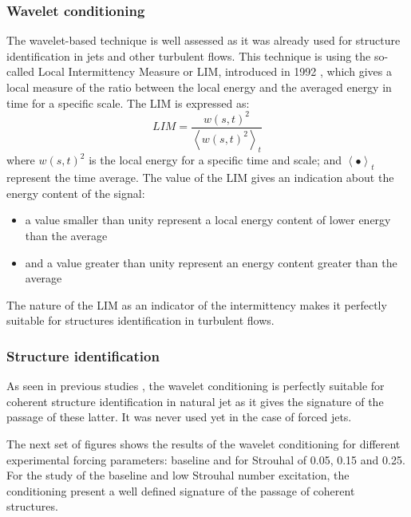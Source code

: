 \documentclass[english]{aiaa-tc}
\begin{document}
\subsubsection{Wavelet conditioning}
The wavelet-based technique is well assessed as it was already used for structure identification in jets and other turbulent flows. This technique is using the so-called Local Intermittency Measure or LIM, introduced in 1992\cite{Farge1992} , which gives a local measure of the ratio between the local energy and the averaged energy in time for a specific scale. The LIM is expressed as:
\begin{equation}
\label{eqn:LIM}
LIM = \frac{w(s, t)^{2}}{\left<w(s, t)^{2}\right>_{t}}
\end{equation}
where $w(s, t)^{2}$ is the local energy for a specific time and scale; and $\left< \bullet \right>_{t}$ represent the time average.
The value of the LIM gives an indication about the energy content of the signal:
\begin{itemize}
\item a value smaller than unity represent a local energy content of lower energy than the average
\item and a value greater than unity represent an energy content greater than the average
\end{itemize}
The nature of the LIM as an indicator of the intermittency makes it perfectly suitable for structures identification in turbulent flows. 

\subsubsection{Structure identification}
As seen in previous studies \cite{Camussi1997}\cite{Camussi1997b}\cite{Camussi2002} , the wavelet conditioning is perfectly suitable for coherent structure identification in natural jet as it gives the signature of the passage of these latter. It was never used yet in the case of forced jets. 

The next set of figures shows the results of the wavelet conditioning for different experimental forcing parameters: baseline and for Strouhal of 0.05, 0.15 and 0.25. For the study of the baseline and low Strouhal number excitation, the conditioning present a well defined signature of the passage of coherent structures. 

\end{document}
